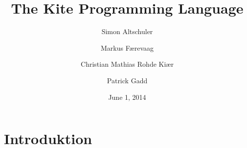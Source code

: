 \documentclass{article}
\title{The Kite Programming Language}
\date{June 1, 2014}
\author{Simon Altschuler}
\affil{\code{s123563}}
\author{Markus Færevaag}
\affil{\code{s123692}}
\author{Christian Mathias Rohde Kiær}
\affil{\code{s123812}}
\author{Patrick Gadd}
\affil{\code{s113491}}
\begin{document}
\maketitle
\clearpage

\tableofcontents
\clearpage

\section{Introduktion}
\end{document}
